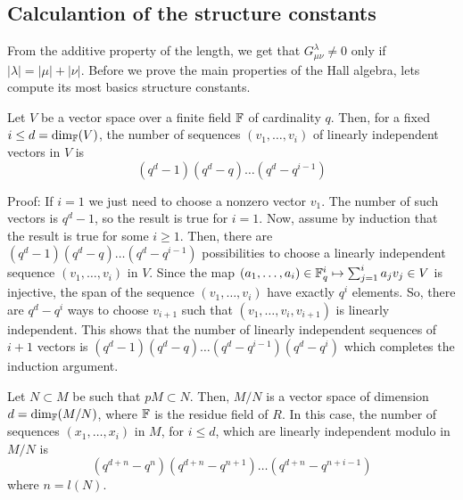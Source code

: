\subsection{Calculantion of the structure constants}
From the additive property of the length, we get that $G_{\mu\nu}^\lambda\neq0$ only if $|\lambda|=|\mu|+|\nu|$. Before we prove the main properties of the Hall algebra, lets compute its most basics structure constants.
\begin{dang}
    \begin{lemma}\label{number_of_linearly_independent_vectors_inV}
        Let $V$ be a vector space over a finite field $\mathbb{F}$ of cardinality $q$. Then, for a fixed $i\leq d=\text{dim}_{\mathbb{F}}(V)$, the number of  sequences $(v_1,\dots,v_i)$ of linearly independent vectors in $V$ is
        \begin{equation}
             (q^d-1)(q^d-q)\dots(q^d-q^{i-1})
        \end{equation}
    \end{lemma}
\end{dang}
Proof: If $i=1$ we just need to choose a nonzero vector $v_1$. The number of such vectors is $q^d-1$, so the result is true for $i=1$. Now, assume by induction that the result is true for some $i\geq1$. Then, there are $(q^d-1)(q^d-q)\dots(q^d-q^{i-1})$ possibilities to choose a linearly independent sequence $(v_1,\dots,v_i)$ in $V$. Since the map $(a_1,\dots,a_i)\in\mathbb{F}_q^i\mapsto \sum_{j=1}^ia_jv_j\in V$ is injective, the span of the sequence $(v_1,\dots,v_i)$ have exactly $q^i$ elements. So, there are $q^d-q^i$ ways to choose $v_{i+1}$ such that $(v_1,\dots,v_i,v_{i+1})$ is linearly independent. This shows that the number of linearly independent sequences of $i+1$ vectors is $(q^d-1)(q^d-q)\dots(q^d-q^{i-1})(q^d-q^i)$ which completes the induction argument.
\begin{dang}
    \begin{lemma}\label{number o LI sequence modulo N}
        Let $N\subset M$ be such that $pM\subset N$. Then, $M/N$ is a vector space of dimension $d=\text{dim}_{\mathbb{F}}(M/N)$, where $\mathbb{F}$ is the residue field of $R$. In this case, the number of sequences $(x_1,\dots,x_i)$ in $M$, for $i\leq d$, which are linearly independent modulo in $M/N$ is
        \begin{equation}
            (q^{d+n}-q^n)(q^{d+n}-q^{n+1})\dots(q^{d+n}-q^{n+i-1})
        \end{equation}
        where $n=l(N)$.
    \end{lemma}
\end{dang}
